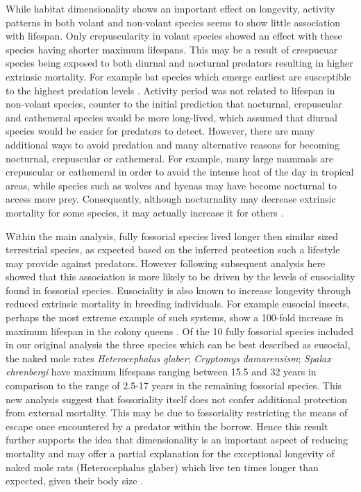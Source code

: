 While habitat dimensionality shows an important effect on longevity, activity patterns in both volant and non-volant species seems to show little association with lifespan. Only crepuscularity in volant species showed an effect with these species having shorter maximum lifespans. This may be a result of crespucuar species being exposed to both diurnal and nocturnal predators resulting in higher extrinsic mortality. For example bat species which emerge earliest are susceptible to the highest predation levels \citep{jones1994foraging}. Activity period was not related to lifespan in non-volant species, counter to the initial prediction that nocturnal, crepuscular and cathemeral species would be more long-lived, which assumed that diurnal species would be easier for predators to detect. However, there are many additional ways to avoid predation and many alternative reasons for becoming nocturnal, crepuscular or cathemeral. For example, many large mammals are crepuscular or cathemeral in order to avoid the intense heat of the day in tropical areas, while species such as wolves and hyenas may have become nocturnal to access more prey. Consequently, although nocturnality may decrease extrinsic mortality for some species, it may actually increase it for others \citep{prugh2014does}.


Within the main analysis, fully fossorial species lived longer then similar sized terrestrial species, as expected based on the inferred protection such a lifestyle may provide against predators. However following \cite{williams2015ecology} subsequent analysis here showed that this association is more likely to be driven by the levels of eusociality found in fossorial species. Eusociality is also known to increase longevity through reduced extrinsic mortality in breeding individuals. For example eusocial insects, perhaps the most extreme example of such systems, show a 100-fold increase in maximum lifespan in the colony queens \citep{keller1997extraordinary}. Of the 10 fully fossorial species included in our original analysis the three species which can be best described as eusocial, the naked mole rates \textit{Heterocephalus glaber}; \textit{Cryptomys damarensism}; \textit{Spalax ehrenbergi} have maximum lifespans ranging between 15.5 and 32 years in comparison to the range of 2.5-17 years in the remaining fossorial species. This new analysis suggest that fossoriality itself does not confer additional protection from external mortality. This may be due to fossoriality restricting the means of escape once encountered by a predator within the borrow. Hence this result further supports the idea that dimensionality is an important aspect of reducing mortality and may offer a partial explanation for the exceptional longevity of naked mole rats (Heterocephalus glaber) which live ten times longer than expected, given their body size \citep{buffenstein2002naked}.


